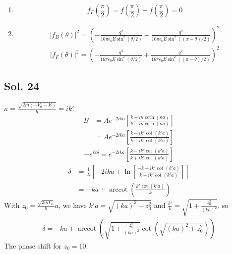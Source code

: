 \begin{enumerate}
\begin{align*}
              f_F(\theta) & =\sum_{l=0}^\infty (2l+1)a_l P_l(\cos\theta) -
              \sum_{l=0}^\infty (2l+1)a_l P_l(\cos(\pi - \theta)) \\
                          & =
              \sum_{l=0}^\infty (2l+1)a_l P_l(\cos\theta) -
              \sum_{l=0}^\infty (2l+1)a_l P_l(-\cos(\theta))
          \end{align*}
          The partial wave for $f_F$ vanishes for even $l$.
    \item
          $$
              f_F(\frac{\pi}{2}) = f(\frac{\pi}{2}) - f(\frac{\pi}{2}) = 0
          $$
    \item
          \begin{align*}
              |f_B(\theta)|^2 =
              (-\frac{q^2}{16\pi\epsilon_0 E\sin^2(\theta/2)}
              -\frac{q^2}{16\pi\epsilon_0 E\sin^2((\pi-\theta)/2)})^2
          \end{align*}
          \begin{align*}
              |f_F(\theta)|^2 =
              (-\frac{q^2}{16\pi\epsilon_0 E\sin^2(\theta/2)}
              +\frac{q^2}{16\pi\epsilon_0 E\sin^2((\pi-\theta)/2)})^2
          \end{align*}
\end{enumerate}

\subsection*{Sol. 24}
$\kappa = \frac{\sqrt{2m(-V_0-E)}}{\hbar}
    =ik'$
\begin{align*}
    B & = Ae^{-2ika}
    \left[
        \frac{k-i\kappa \coth(\kappa a)}{k + i\kappa \coth(\kappa a)}
        \right] \\
      & =
    Ae^{-2ika}
    \left[
        \frac{k-ik' \cot(k'a)}{k + ik' \cot(k' a)}
        \right]
\end{align*}
\begin{align*}
    -e^{i2\delta}
    =e^{-2ika}
    \left[
        \frac{k-ik' \cot(k'a)}{k + ik' \cot(k' a)}
        \right]
\end{align*}
\begin{align*}
    \delta
     & =
    \frac{1}{2i}
    \left[
        -2ika
        +
        \ln
        \left[
            \frac{-k+ik' \cot(k'a)}{k + ik' \cot(k' a)}
            \right]
        \right] \\
     & =-ka +
    \operatorname{arccot}\left(
    \frac{k'\cot(k'a)}{k}
    \right)
\end{align*}
With $z_0 = \frac{\sqrt{2mV_0}}{\hbar}a$, we have $k'a = \sqrt{(ka)^2 + z_0^2}$ and $\frac{k'}{k} = \sqrt{1 + \frac{z_0^2}{(ka)^2}}$, so
\begin{align*}
    \delta = -ka +
    \operatorname{arccot}\left(
    \sqrt{1 + \frac{z_0^2}{(ka)^2}}
    \cot\left(\sqrt{(ka)^2 + z_0^2}\right)
    \right)
\end{align*}
The phase shift for $z_0 = 10$:

